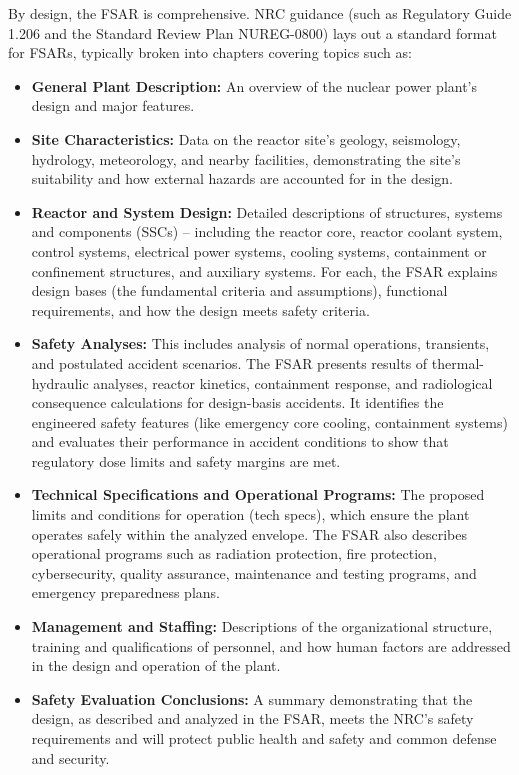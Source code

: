 \documentclass[5p,authoryear]{elsarticle}
\begin{document}
By design, the FSAR is comprehensive. NRC guidance (such as Regulatory Guide 1.206 \cite{RG1.206} and the Standard Review Plan NUREG-0800) lays out a standard format for FSARs, typically broken into chapters covering topics such as:
\vspace{0.2cm}

\begin{itemize}
    \item \textbf{General Plant Description:} An overview of the nuclear power plant's design and major features.
    \item \textbf{Site Characteristics:} Data on the reactor site’s geology, seismology, hydrology, meteorology, and nearby facilities, demonstrating the site's suitability and how external hazards are accounted for in the design.
    \item \textbf{Reactor and System Design:} Detailed descriptions of structures, systems and components (SSCs) – including the reactor core, reactor coolant system, control systems, electrical power systems, cooling systems, containment or confinement structures, and auxiliary systems. For each, the FSAR explains design bases (the fundamental criteria and assumptions), functional requirements, and how the design meets safety criteria.
    \item \textbf{Safety Analyses:} This includes analysis of normal operations, transients, and postulated accident scenarios. The FSAR presents results of thermal-hydraulic analyses, reactor kinetics, containment response, and radiological consequence calculations for design-basis accidents. It identifies the engineered safety features (like emergency core cooling, containment systems) and evaluates their performance in accident conditions to show that regulatory dose limits and safety margins are met.
    \item \textbf{Technical Specifications and Operational Programs:} The proposed limits and conditions for operation (tech specs), which ensure the plant operates safely within the analyzed envelope. The FSAR also describes operational programs such as radiation protection, fire protection, cybersecurity, quality assurance, maintenance and testing programs, and emergency preparedness plans.
    \item \textbf{Management and Staffing:} Descriptions of the organizational structure, training and qualifications of personnel, and how human factors are addressed in the design and operation of the plant.
    \item \textbf{Safety Evaluation Conclusions:} A summary demonstrating that the design, as described and analyzed in the FSAR, meets the NRC’s safety requirements and will protect public health and safety and common defense and security.
\end{itemize}
\end{document}
